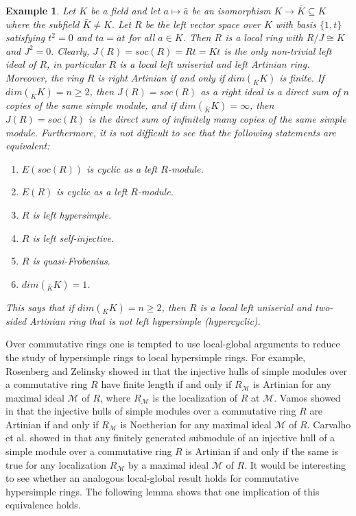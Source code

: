 \documentclass{amsart}
\theoremstyle{plain}
\newtheorem{example}[theorem]{Example}
\numberwithin{equation}{section}
\begin{document}
\begin{example}
\label{Example of a 2-sided art ring that is left SF but not rt GSF}
Let $K$ be a field and let $a \mapsto \bar{a}$ be an isomorphism $K \rightarrow \bar{K} \subseteq K$ where the subfield $\bar{K} \neq K\text{.}$ Let $R$ be the left vector space over $K$ with basis $\{1 ,t\}$ satisfying $t^{2} =0$ and $t a =\bar{a} t$ for all $a \in K$. Then $R$ is a local ring with $R/J \cong K$ and $J^{2} =0.$ Clearly, $J (R) =s o c (R) =R t =K t$ is the only non-trivial left ideal of $R$, in particular $R$ is a local left uniserial and left Artinian ring. Moreover, the ring $R$ is right Artinian if and only if $d i m (_{\bar{K}} K)$ is finite. If $d i m (_{\bar{K}} K) =n \geqslant 2$, then $J (R) =s o c (R)$ as a right ideal is a direct sum of $n$ copies of the same simple module, and if $d i m (_{\bar{K}} K) =\infty $, then $J (R) =s o c (R)$ is the direct sum of infinitely many copies of the same simple module. Furthermore, it is not difficult to see that the following statements
are equivalent: 


\begin{enumerate}
\item $E (s o c (R))$ is cyclic as a left $R$-module. 

\item $E (R)$ is cyclic as a left $R$-module. 

\item $R$ is left hypersimple. 

\item $R$ is left self-injective. 

\item $R$ is quasi-Frobenius. 

\item $d i m (_{\bar{K}} K) =1$. \end{enumerate}


This says that if $d i m (_{\bar{K}} K) =n \geq 2$, then $R$ is a local left uniserial and two-sided Artinian ring that is not left hypersimple (hypercyclic). 
\end{example}

Over
commutative rings one is tempted to use local-global arguments to reduce the study of hypersimple rings to local hypersimple rings. For example, Rosenberg
and Zelinsky showed in \cite[Theorem 5]{RZ}
that the injective hulls of simple modules over a commutative ring $R$ have finite length if and only if $R_{\mathcal{M}}$ is Artinian for any maximal ideal $\mathcal{M}$ of $R$, where $R_{\mathcal{M}}$ is the localization of $R$ at $\mathcal{M}$. Vamos showed in \cite[Theorem 2]{V}
that the injective hulls of simple modules over a commutative ring $R$ are Artinian if and only if $R_{\mathcal{M}}$ is Noetherian for any maximal ideal $\mathcal{M}$ of $R$. Carvalho et al. showed in \cite[Theorem 3.3]{CLS}
that any finitely generated submodule of an injective hull of a simple module over a commutative ring $R$ is Artinian if and only if the same is true for any localization $R_{\mathcal{M}}$ by a maximal ideal $\mathcal{M}$ of $R$. It would be interesting to see whether an analogous local-global result holds for commutative hypersimple rings. The following lemma
shows that one implication of this equivalence holds. 
\end{document}
